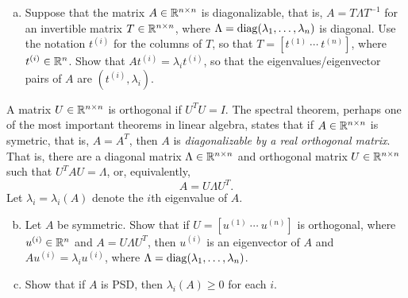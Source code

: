   \begin{enumerate}[(a)]

  \item
    \label{item:diagonalizable-A}
    Suppose that the matrix $A \in \mathbb{R}^{n \times n}$ is diagonalizable,
    that is, $A = T \Lambda T^{-1}$ for an invertible matrix $T \in \mathbb{R}^{n
      \times n}$, where $\Lambda = \mathop{\rm diag}(\lambda_1, \ldots, \lambda_n)$ is
    diagonal. Use the notation $t^{(i)}$ for the columns
    of $T$, so that $T = [t^{(1)} ~ \cdots ~ t^{(n)}]$, where $t^{(i)} \in \mathbb{R}^n$. Show
    that $A t^{(i)} = \lambda_i t^{(i)}$, so that
    the eigenvalues/eigenvector pairs of $A$ are $(t^{(i)}, \lambda_i)$.

  \end{enumerate}

  A matrix $U \in \mathbb{R}^{n \times n}$ is orthogonal if $U^T U = I$.
  The spectral theorem, perhaps one of the most important theorems in
  linear algebra, states that if $A \in \mathbb{R}^{n \times n}$ is symetric,
  that is, $A= A^T$,
  then $A$ is \emph{diagonalizable by a real orthogonal matrix}. That is,
  there are a diagonal matrix $\Lambda \in \mathbb{R}^{n \times n}$ and
  orthogonal matrix $U \in \mathbb{R}^{n \times n}$ such that
  $U^T A U = \Lambda$, or, equivalently,
  \begin{equation*}
    A = U \Lambda U^T.
  \end{equation*}
  Let $\lambda_i = \lambda_i(A)$ denote the $i$th eigenvalue of $A$.
  \begin{enumerate}[(a)]
    \setcounter{enumii}{1}
  \item Let $A$ be symmetric. Show that if $U = [u^{(1)} ~ \cdots ~ u^{(n)}]$
    is orthogonal,
    where $u^{(i)} \in \mathbb{R}^n$ and $A = U \Lambda U^T$, then
    $u^{(i)}$ is an eigenvector of $A$ and
    $A u^{(i)} = \lambda_i u^{(i)}$, where
    $\Lambda = \mathop{\rm diag}(\lambda_1, \ldots, \lambda_n)$.

  \item Show that if $A$ is PSD, then $\lambda_i(A) \ge 0$ for each $i$.

  \end{enumerate}